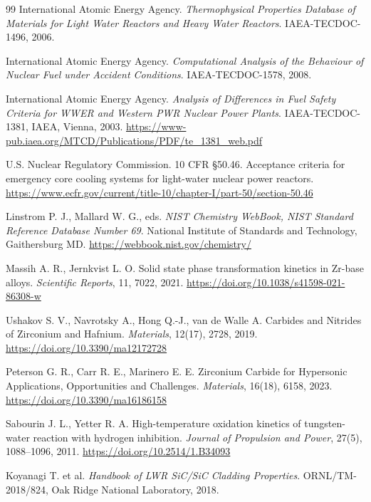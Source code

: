 \documentclass[12pt]{article}
\begin{document}
\begin{thebibliography}{99}
International Atomic Energy Agency.
\textit{Thermophysical Properties Database of Materials for Light Water Reactors and Heavy Water Reactors}.
IAEA-TECDOC-1496, 2006.

International Atomic Energy Agency.
\textit{Computational Analysis of the Behaviour of Nuclear Fuel under Accident Conditions}.
IAEA-TECDOC-1578, 2008.

International Atomic Energy Agency.
\textit{Analysis of Differences in Fuel Safety Criteria for WWER and Western PWR Nuclear Power Plants}.
IAEA-TECDOC-1381, IAEA, Vienna, 2003.
\url{https://www-pub.iaea.org/MTCD/Publications/PDF/te_1381_web.pdf}

U.S. Nuclear Regulatory Commission.
10 CFR \S 50.46. Acceptance criteria for emergency core cooling systems for light-water nuclear power reactors.
\url{https://www.ecfr.gov/current/title-10/chapter-I/part-50/section-50.46}

Linstrom P. J., Mallard W. G., eds.
\textit{NIST Chemistry WebBook, NIST Standard Reference Database Number 69}.
National Institute of Standards and Technology, Gaithersburg MD.
\url{https://webbook.nist.gov/chemistry/}

Massih A. R., Jernkvist L. O.
Solid state phase transformation kinetics in Zr-base alloys.
\textit{Scientific Reports}, 11, 7022, 2021.
\url{https://doi.org/10.1038/s41598-021-86308-w}

Ushakov S. V., Navrotsky A., Hong Q.-J., van de Walle A.
Carbides and Nitrides of Zirconium and Hafnium.
\textit{Materials}, 12(17), 2728, 2019.
\url{https://doi.org/10.3390/ma12172728}

Peterson G. R., Carr R. E., Marinero E. E.
Zirconium Carbide for Hypersonic Applications, Opportunities and Challenges.
\textit{Materials}, 16(18), 6158, 2023.
\url{https://doi.org/10.3390/ma16186158}

Sabourin J. L., Yetter R. A.
High-temperature oxidation kinetics of tungsten-water reaction with hydrogen inhibition.
\textit{Journal of Propulsion and Power}, 27(5), 1088--1096, 2011.
\url{https://doi.org/10.2514/1.B34093}

Koyanagi T. et al.
\textit{Handbook of LWR SiC/SiC Cladding Properties}.
ORNL/TM-2018/824, Oak Ridge National Laboratory, 2018.


\end{thebibliography}
\end{document}
